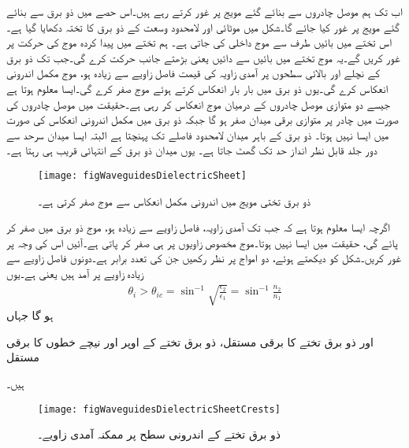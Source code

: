 اب تک ہم موصل چادروں سے بنائے گئے مویج پر غور کرتے رہے ہیں۔اس حصے میں ذو برق سے بنائے گئے مویج پر غور کیا جائے گا۔شکل  میں  موٹائی اور لامحدود وسعت کے ذو برق کا تختہ دکھایا گیا ہے۔اس تختے میں بائیں طرف سے  موج داخلی کی جاتی ہے۔ ہم تختے میں پیدا کردہ موج کی حرکت پر غور کریں گے۔یہ موج تختے میں بائیں سے دائیں یعنی  بڑھتے  جانب حرکت کرے گی۔جب تک ذو برق کے نچلے اور بالائی سطحوں پر آمدی زاویہ کی قیمت فاصل زاویے سے زیادہ ہو، موج مکمل اندرونی انعکاس کرے گی۔یوں ذو برق میں بار بار انعکاس کرتے ہوئے  موج صفر کرے گی۔ایسا معلوم ہوتا ہے جیسے  دو متوازی موصل چادروں کے درمیان موج انعکاس کر رہی ہے۔حقیقت میں موصل چادروں کی صورت میں چادر پر متوازی برقی میدان صفر ہو گا جبکہ ذو برق میں مکمل اندرونی انعکاس کی صورت میں ایسا نہیں ہوتا۔ ذو برق  کے باہر میدان  لامحدود فاصلے تک پہنچتا ہے البتہ ایسا میدان سرحد سے دور جلد قابل نظر انداز حد تک گھٹ جاتا ہے۔ یوں میدان ذو برق کے انتہائی قریب ہی رہتا ہے۔
\begin{figure}
\centering
\texttt{[image: figWaveguidesDielectricSheet]}
\caption{ذو برق تختی مویج میں اندرونی مکمل انعکاس سے موج صفر کرتی ہے۔}
\label{شکل_مویج_تختہ}
\end{figure}

اگرچہ ایسا معلوم ہوتا ہے کہ  جب تک آمدی زاویہ، فاصل زاویے سے زیادہ  ہو، موج ذو برق میں صفر کر پائے گی، حقیقت میں ایسا نہیں ہوتا۔موج مخصوص زاویوں پر ہی صفر کر پاتی ہے۔آئیں اس کی وجہ پر غور کریں۔شکل کو دیکھتے ہوئے، دو  امواج پر نظر رکھیں جن کی تعدد برابر ہے۔دونوں فاصل زاویے سے زیادہ زاویے پر آمد ہیں یعنی  ہے۔یوں
\begin{align}\label{مساوات_مویج_ابن_سھل_قانون}
\theta_i > \theta_{ic}=\sin^{-1} \sqrt{\frac{\epsilon_2}{\epsilon_1}}=\sin^{-1}\frac{n_2}{n_1}
\end{align}
ہو گا جہاں 
\begin{description}
 اور
 ذو برق تختے کا برقی مستقل،
 ذو برق تختے کے اوپر اور نیچے خطوں کا برقی مستقل
\end{description}
ہیں۔

\begin{figure}
\centering
\texttt{[image: figWaveguidesDielectricSheetCrests]}
\caption{ذو برق تختے کے اندرونی سطح پر ممکنہ آمدی زاویے۔}
\label{شکل_مویج_تختہ_ممکنہ_راستے}
\end{figure}

